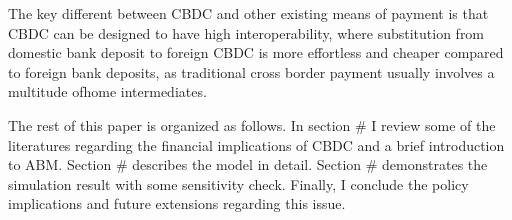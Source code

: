 The key different between CBDC and other existing means of payment is that CBDC
can be designed to have high interoperability, where substitution from domestic
bank deposit to foreign CBDC is more effortless and cheaper compared to foreign
bank deposits, as traditional cross border payment usually involves a multitude
ofhome intermediates.

The rest of this paper is organized as follows. In section \# I review some of the literatures regarding the financial implications of CBDC and a brief introduction to ABM. Section \# describes the model in detail. Section \# demonstrates the simulation result with some sensitivity check. Finally, I conclude the policy implications and future extensions regarding this issue.